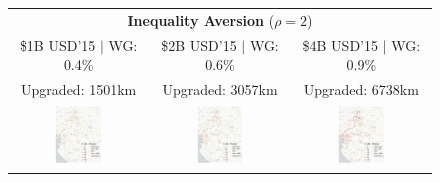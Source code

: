 \documentclass[a4paper]{article}
\begin{document}
\begin{figure}[H]
{\begin{tabular}{@{}c@{}c@{}c@{}}
\multicolumn{3}{c}{\textbf{Inequality Aversion} ($\rho = 2$)} \\ [0.5em]
\$1B USD'15 $|$ WG: 0.4\% & \$2B USD'15 $|$ WG: 0.6\% & \$4B USD'15 $|$ WG: 0.9\%  \\
Upgraded: 1501km & Upgraded: 3057km & Upgraded: 6738km \\ 
\includegraphics[width=0.38\textwidth, trim= {0.9cm 0 0.9cm 0}, clip]{"../figures/GE/trans_africa_network_GE_20g_1b_fixed_cgc_sigma3.8_rho2_julia_MACR_90kmh_google_perc_ug.pdf"} & 
\includegraphics[width=0.38\textwidth, trim= {0.9cm 0 0.9cm 0}, clip]{"../figures/GE/trans_africa_network_GE_20g_2b_fixed_cgc_sigma3.8_rho2_julia_MACR_90kmh_google_perc_ug.pdf"} &
\includegraphics[width=0.38\textwidth, trim= {0.9cm 0 0.9cm 0}, clip]{"../figures/GE/trans_africa_network_GE_20g_4b_fixed_cgc_sigma3.8_rho2_julia_MACR_90kmh_google_perc_ug.pdf"}   \\

\end{tabular}}
\end{figure}
\end{document}
